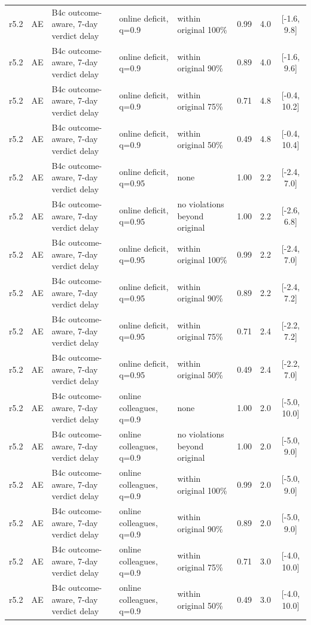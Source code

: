 \begin{longtable}{lllp{4.2cm}p{3.4cm}ccc}
r5.2 & AE & B4c outcome-aware, 7-day verdict delay & online deficit, q=0.9 & within original 100\% & 0.99 & 4.0 & [-1.6, 9.8] \\
r5.2 & AE & B4c outcome-aware, 7-day verdict delay & online deficit, q=0.9 & within original 90\% & 0.89 & 4.0 & [-1.6, 9.6] \\
r5.2 & AE & B4c outcome-aware, 7-day verdict delay & online deficit, q=0.9 & within original 75\% & 0.71 & 4.8 & [-0.4, 10.2] \\
r5.2 & AE & B4c outcome-aware, 7-day verdict delay & online deficit, q=0.9 & within original 50\% & 0.49 & 4.8 & [-0.4, 10.4] \\
r5.2 & AE & B4c outcome-aware, 7-day verdict delay & online deficit, q=0.95 & none & 1.00 & 2.2 & [-2.4, 7.0] \\
r5.2 & AE & B4c outcome-aware, 7-day verdict delay & online deficit, q=0.95 & no violations beyond original & 1.00 & 2.2 & [-2.6, 6.8] \\
r5.2 & AE & B4c outcome-aware, 7-day verdict delay & online deficit, q=0.95 & within original 100\% & 0.99 & 2.2 & [-2.4, 7.0] \\
r5.2 & AE & B4c outcome-aware, 7-day verdict delay & online deficit, q=0.95 & within original 90\% & 0.89 & 2.2 & [-2.4, 7.2] \\
r5.2 & AE & B4c outcome-aware, 7-day verdict delay & online deficit, q=0.95 & within original 75\% & 0.71 & 2.4 & [-2.2, 7.2] \\
r5.2 & AE & B4c outcome-aware, 7-day verdict delay & online deficit, q=0.95 & within original 50\% & 0.49 & 2.4 & [-2.2, 7.0] \\
r5.2 & AE & B4c outcome-aware, 7-day verdict delay & online colleagues, q=0.9 & none & 1.00 & 2.0 & [-5.0, 10.0] \\
r5.2 & AE & B4c outcome-aware, 7-day verdict delay & online colleagues, q=0.9 & no violations beyond original & 1.00 & 2.0 & [-5.0, 9.0] \\
r5.2 & AE & B4c outcome-aware, 7-day verdict delay & online colleagues, q=0.9 & within original 100\% & 0.99 & 2.0 & [-5.0, 9.0] \\
r5.2 & AE & B4c outcome-aware, 7-day verdict delay & online colleagues, q=0.9 & within original 90\% & 0.89 & 2.0 & [-5.0, 9.0] \\
r5.2 & AE & B4c outcome-aware, 7-day verdict delay & online colleagues, q=0.9 & within original 75\% & 0.71 & 3.0 & [-4.0, 10.0] \\
r5.2 & AE & B4c outcome-aware, 7-day verdict delay & online colleagues, q=0.9 & within original 50\% & 0.49 & 3.0 & [-4.0, 10.0] \\

\end{longtable}

